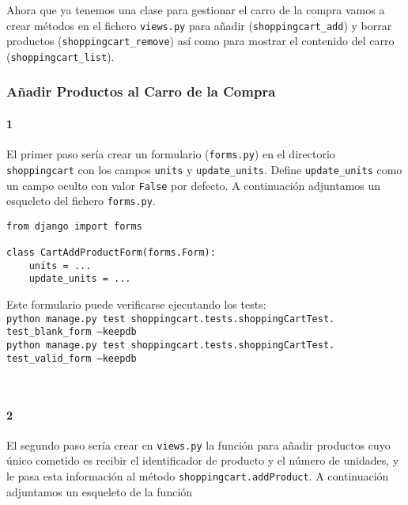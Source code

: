 \documentclass[12pt]{article} %
\newcommand{\ttt}[1]{\texttt{#1}}%
\newcommand{\views}{\texttt{views.py}}%
\newcommand{\forms}{\texttt{forms.py}}%
\begin{document}

Ahora que ya tenemos una clase para gestionar el carro de la compra vamos 
a crear métodos en el fichero \views{} para añadir (\ttt{shoppingcart\_add}) y borrar productos (\ttt{shoppingcart\_remove}) así como 
para mostrar el contenido del carro (\ttt{shoppingcart\_list}).

\subsubsection {Añadir Productos al Carro de la Compra}

\paragraph{1} El primer paso sería crear un formulario (\forms) en el directorio \ttt{shoppingcart} con los campos \ttt{units} y \ttt{update\_units}. Define  \ttt{update\_units} como un campo oculto con valor \ttt{False} por defecto. A continuación adjuntamos un esqueleto del fichero \forms.

\begin{lstlisting}
from django import forms

class CartAddProductForm(forms.Form):
    units = ...
    update_units = ...
\end{lstlisting}

\begin{minipage}{\textwidth}
Este formulario puede verificarse ejecutando los tests:\\ 
\ttt{python manage.py test shoppingcart.tests.shoppingCartTest.\\test\_blank\_form --keepdb}\\ \ttt{python manage.py test shoppingcart.tests.shoppingCartTest.\\test\_valid\_form --keepdb}
\end{minipage}\\

\paragraph{2} El segundo paso sería crear en \views{} la función para añadir productos cuyo único cometido es recibir el identificador de producto y el número de unidades, y le pasa esta información al método \ttt{shoppingcart.addProduct}. A continuación adjuntamos un esqueleto de la función\\
\end{document}
